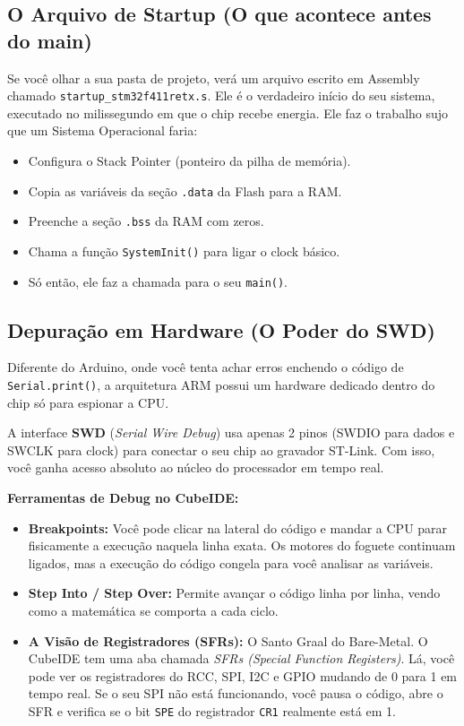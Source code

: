\documentclass[12pt,a4paper]{article}
\begin{document}
\subsection{O Arquivo de Startup (O que acontece antes do main)}
Se você olhar a sua pasta de projeto, verá um arquivo escrito em Assembly chamado \texttt{startup\_stm32f411retx.s}. Ele é o verdadeiro início do seu sistema, executado no milissegundo em que o chip recebe energia.
Ele faz o trabalho sujo que um Sistema Operacional faria:
\begin{itemize}
    \item Configura o Stack Pointer (ponteiro da pilha de memória).
    \item Copia as variáveis da seção \texttt{.data} da Flash para a RAM.
    \item Preenche a seção \texttt{.bss} da RAM com zeros.
    \item Chama a função \texttt{SystemInit()} para ligar o clock básico.
    \item Só então, ele faz a chamada para o seu \texttt{main()}.
\end{itemize}

\subsection{Depuração em Hardware (O Poder do SWD)}
Diferente do Arduino, onde você tenta achar erros enchendo o código de \texttt{Serial.print()}, a arquitetura ARM possui um hardware dedicado dentro do chip só para espionar a CPU.

A interface \textbf{SWD} (\textit{Serial Wire Debug}) usa apenas 2 pinos (SWDIO para dados e SWCLK para clock) para conectar o seu chip ao gravador ST-Link. Com isso, você ganha acesso absoluto ao núcleo do processador em tempo real.

\textbf{Ferramentas de Debug no CubeIDE:}
\begin{itemize}
    \item \textbf{Breakpoints:} Você pode clicar na lateral do código e mandar a CPU parar fisicamente a execução naquela linha exata. Os motores do foguete continuam ligados, mas a execução do código congela para você analisar as variáveis.
    \item \textbf{Step Into / Step Over:} Permite avançar o código linha por linha, vendo como a matemática se comporta a cada ciclo.
    \item \textbf{A Visão de Registradores (SFRs):} O Santo Graal do Bare-Metal. O CubeIDE tem uma aba chamada \textit{SFRs (Special Function Registers)}. Lá, você pode ver os registradores do RCC, SPI, I2C e GPIO mudando de 0 para 1 em tempo real. Se o seu SPI não está funcionando, você pausa o código, abre o SFR e verifica se o bit \texttt{SPE} do registrador \texttt{CR1} realmente está em 1.
\end{itemize}
\end{document}
